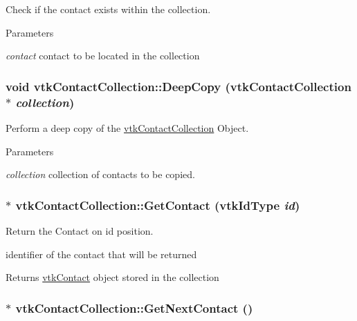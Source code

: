 Check if the contact exists within the collection. 


\begin{DoxyParams}{Parameters}
\item[{\em contact}]contact to be located in the collection \end{DoxyParams}
\hypertarget{classvtkContactCollection_ac35b5e32c81e6f21e4115591b282489a}{
\subsubsection[{DeepCopy}]{\setlength{\rightskip}{0pt plus 5cm}void vtkContactCollection::DeepCopy ({\bf vtkContactCollection} $\ast$ {\em collection})}}
\label{classvtkContactCollection_ac35b5e32c81e6f21e4115591b282489a}


Perform a deep copy of the \hyperlink{classvtkContactCollection}{vtkContactCollection} Object. 


\begin{DoxyParams}{Parameters}
\item[{\em collection}]collection of contacts to be copied. \end{DoxyParams}
\hypertarget{classvtkContactCollection_a0f3dcad137c9a1d088c1ca6585c2120c}{
\subsubsection[{GetContact}]{ $\ast$ vtkContactCollection::GetContact (vtkIdType {\em id})}}
\label{classvtkContactCollection_a0f3dcad137c9a1d088c1ca6585c2120c}


Return the Contact on id position. 

identifier of the contact that will be returned \begin{DoxyReturn}{Returns}
\hyperlink{classvtkContact}{vtkContact} object stored in the collection 
\end{DoxyReturn}
\hypertarget{classvtkContactCollection_a4e9a9f6aec44e28433aaa02bb7aca941}{
\subsubsection[{GetNextContact}]{ $\ast$ vtkContactCollection::GetNextContact ()}}
\label{classvtkContactCollection_a4e9a9f6aec44e28433aaa02bb7aca941}



